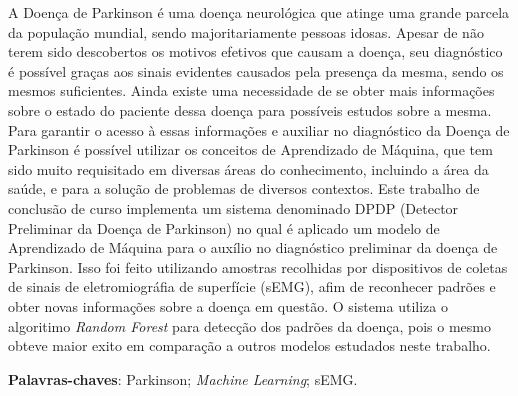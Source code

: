 \begin{resumo}
    A Doença de Parkinson é uma doença neurológica que atinge uma grande parcela da população mundial, sendo majoritariamente pessoas idosas. Apesar de não terem sido descobertos os motivos efetivos que causam a doença, seu diagnóstico é possível graças aos sinais evidentes causados pela presença da mesma, sendo os mesmos suficientes. Ainda existe uma necessidade de se obter mais informações sobre o estado do paciente dessa doença para possíveis estudos sobre a mesma. Para garantir o acesso à essas informações e auxiliar no diagnóstico da Doença de Parkinson é possível utilizar os conceitos de Aprendizado de Máquina, que tem sido muito requisitado em diversas áreas do conhecimento, incluindo a área da saúde, e para a solução de problemas de diversos contextos. Este trabalho de conclusão de curso implementa um sistema denominado DPDP (Detector Preliminar da Doença de Parkinson) no qual é aplicado um modelo de Aprendizado de Máquina para o auxílio no diagnóstico preliminar da doença de Parkinson. Isso foi feito utilizando amostras recolhidas por dispositivos de coletas de sinais de eletromiográfia de superfície (sEMG), afim de reconhecer padrões e obter novas informações sobre a doença em questão. O sistema utiliza o algoritimo \textit{Random Forest} para detecção dos padrões da doença, pois o mesmo obteve maior exito em comparação a outros modelos estudados neste trabalho.

 \vspace{\onelineskip}
    
 \noindent
 \textbf{Palavras-chaves}: Parkinson; \textit{Machine Learning}; sEMG.
\end{resumo}
